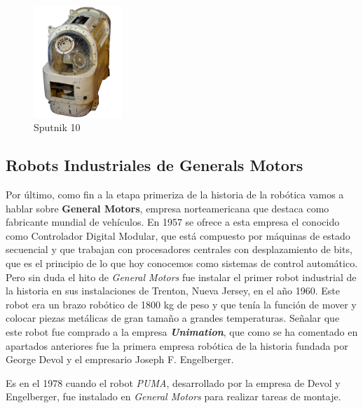 \begin{figure}[H]
\begin{center}
  \includegraphics[width=0.3\textwidth]{./EtapaPrimeriza/imagenes/s10.jpg}
  \caption{Sputnik 10}
  \label{s2}
\end{center}
\end{figure}





\subsection{Robots Industriales de Generals Motors}


Por último, como fin a la etapa primeriza de la historia de la robótica vamos a hablar sobre \textbf{General Motors}, empresa norteamericana que destaca como fabricante mundial de vehículos. En 1957 se ofrece a esta empresa el conocido como Controlador Digital Modular, que está compuesto por máquinas de estado secuencial y que trabajan con procesadores centrales con desplazamiento de bits, que es el principio de lo que hoy conocemos como sistemas de control automático.\\


Pero sin duda el hito de \textit{General Motors} fue instalar el primer robot industrial de la historia en sus instalaciones de Trenton, Nueva Jersey, en el año 1960. Este robot era un brazo robótico de 1800 kg de peso y que tenía la función de mover y colocar piezas metálicas de gran tamaño a grandes temperaturas. Señalar que este robot fue comprado a la empresa \textit{\textbf{Unimation}}, que como se ha comentado en apartados anteriores fue la primera empresa robótica de la historia fundada por  George Devol y el empresario  Joseph F. Engelberger.

Es en el 1978 cuando el robot \textit{PUMA}, desarrollado por la empresa de Devol y Engelberger, fue instalado en \textit{General Motors} para realizar tareas de montaje.





